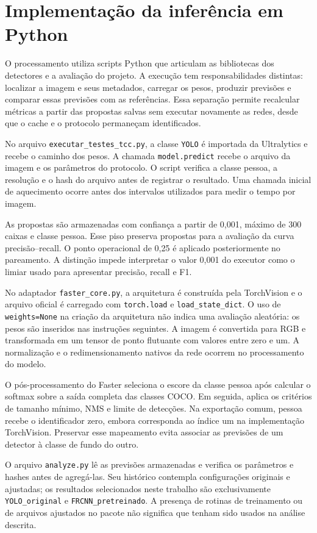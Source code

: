 \section{Implementação da inferência em Python}
O processamento utiliza scripts Python que articulam as bibliotecas dos detectores e a avaliação do projeto. A execução tem responsabilidades distintas: localizar a imagem e seus metadados, carregar os pesos, produzir previsões e comparar essas previsões com as referências. Essa separação permite recalcular métricas a partir das propostas salvas sem executar novamente as redes, desde que o cache e o protocolo permaneçam identificados.

No arquivo \texttt{executar\_testes\_tcc.py}, a classe \texttt{YOLO} é importada da Ultralytics e recebe o caminho dos pesos. A chamada \texttt{model.predict} recebe o arquivo da imagem e os parâmetros do protocolo. O script verifica a classe pessoa, a resolução e o hash do arquivo antes de registrar o resultado. Uma chamada inicial de aquecimento ocorre antes dos intervalos utilizados para medir o tempo por imagem.

As propostas são armazenadas com confiança a partir de 0,001, máximo de 300 caixas e classe pessoa. Esse piso preserva propostas para a avaliação da curva precisão--recall. O ponto operacional de 0,25 é aplicado posteriormente no pareamento. A distinção impede interpretar o valor 0,001 do executor como o limiar usado para apresentar precisão, recall e F1.

No adaptador \texttt{faster\_core.py}, a arquitetura é construída pela TorchVision e o arquivo oficial é carregado com \texttt{torch.load} e \texttt{load\_state\_dict}. O uso de \texttt{weights=None} na criação da arquitetura não indica uma avaliação aleatória: os pesos são inseridos nas instruções seguintes. A imagem é convertida para RGB e transformada em um tensor de ponto flutuante com valores entre zero e um. A normalização e o redimensionamento nativos da rede ocorrem no processamento do modelo.

O pós-processamento do Faster seleciona o escore da classe pessoa após calcular o softmax sobre a saída completa das classes COCO. Em seguida, aplica os critérios de tamanho mínimo, NMS e limite de detecções. Na exportação comum, pessoa recebe o identificador zero, embora corresponda ao índice um na implementação TorchVision. Preservar esse mapeamento evita associar as previsões de um detector à classe de fundo do outro.

O arquivo \texttt{analyze.py} lê as previsões armazenadas e verifica os parâmetros e hashes antes de agregá-las. Seu histórico contempla configurações originais e ajustadas; os resultados selecionados neste trabalho são exclusivamente \texttt{YOLO\_original} e \texttt{FRCNN\_pretreinado}. A presença de rotinas de treinamento ou de arquivos ajustados no pacote não significa que tenham sido usados na análise descrita.

